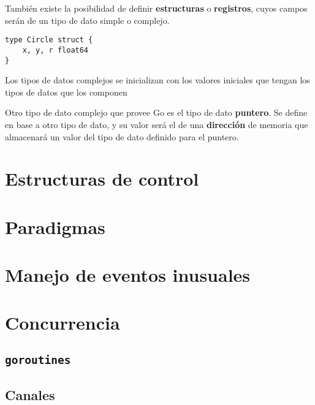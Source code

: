 También existe la posibilidad de definir \textbf{estructuras} o \textbf{registros}, cuyos campos serán de un tipo de dato simple o complejo.

\vspace*{5mm}
\begin{lstlisting}[title=Definición de un tipo de registro \texttt{Circle} con tres campos del mismo tipo]
type Circle struct {
    x, y, r float64
}
\end{lstlisting}

Los tipos de datos complejos se inicializan con los valores iniciales que tengan los tipos de datos que los componen

Otro tipo de dato complejo que provee Go es el tipo de dato \textbf{puntero}. Se define en base a otro tipo de dato, y su valor será el de una \textbf{dirección} de memoria que almacenará un valor del tipo de dato definido para el puntero.  



\section{Estructuras de control}


\section{Paradigmas}


\section{Manejo de eventos inusuales}


\section{Concurrencia}
\subsection{\texttt{goroutines}}
\subsection{Canales}













\clearpage
\printbibliography



